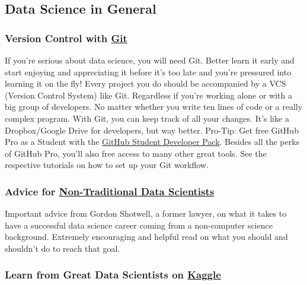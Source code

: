 \documentclass[
  11pt,
]{article}
\begin{document}
\hypertarget{data-science-in-general}{%
\subsection{Data Science in General}\label{data-science-in-general}}

\hypertarget{version-control-with-git}{%
\subsubsection*{\texorpdfstring{Version Control with \href{https://github.com/}{Git}}{Version Control with Git}}\label{version-control-with-git}}

If you're serious about data science, you will need Git. Better learn it early and start enjoying and appreciating it before it's too late and you're pressured into learning it on the fly! Every project you do should be accompanied by a VCS (Version Control System) like Git. Regardless if you're working alone or with a big group of developers. No matter whether you write ten lines of code or a really complex program. With Git, you can keep track of all your changes. It's like a Dropbox/Google Drive for developers, but way better. Pro-Tip: Get free GitHub Pro as a Student with the \href{https://education.github.com/pack}{GitHub Student Developer Pack}. Besides all the perks of GitHub Pro, you'll also free access to many other great tools. See the respective tutorials on how to set up your Git workflow.

\hypertarget{advice-for-non-traditional-data-scientists}{%
\subsubsection*{\texorpdfstring{Advice for \href{https://blog.shotwell.ca/posts/learning_data_science/}{Non-Traditional Data Scientists}}{Advice for Non-Traditional Data Scientists}}\label{advice-for-non-traditional-data-scientists}}

Important advice from Gordon Shotwell, a former lawyer, on what it takes to have a successful data science career coming from a non-computer science background. Extremely encouraging and helpful read on what you should and shouldn't do to reach that goal.

\hypertarget{learn-from-great-data-scientists-on-kaggle}{%
\subsubsection*{\texorpdfstring{Learn from Great Data Scientists on \href{https://www.kaggle.com/}{Kaggle}}{Learn from Great Data Scientists on Kaggle}}\label{learn-from-great-data-scientists-on-kaggle}}
\end{document}
